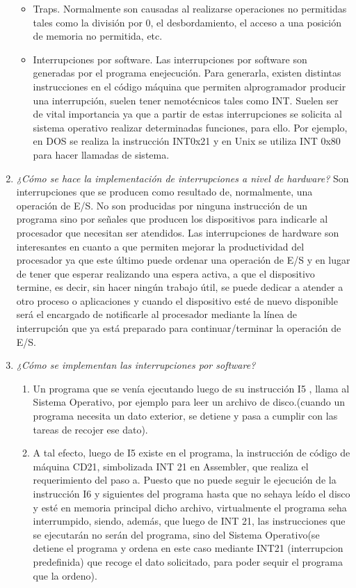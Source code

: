 \documentclass[a4paper,12pt]{article}
\begin{document}
\begin{enumerate}
\begin{itemize}
\item Traps. Normalmente son causadas al realizarse operaciones no permitidas tales como la división por 0, el desbordamiento, el acceso a una posición de memoria no permitida, etc.

\item Interrupciones por software. Las interrupciones por software son generadas por el programa enejecución. Para generarla, existen distintas instrucciones en el código máquina que permiten alprogramador producir una interrupción, suelen tener nemotécnicos tales como INT. Suelen ser de vital importancia ya que a partir de estas interrupciones se solicita al sistema operativo realizar determinadas funciones, para ello. Por ejemplo, en DOS se realiza la instrucción INT0x21 y en Unix se utiliza INT 0x80 para hacer llamadas de sistema.


\end{itemize}

\item {\it ¿Cómo se hace la implementación de interrupciones a nivel de hardware?}
Son interrupciones que se producen como resultado de, normalmente, una operación de E/S. No son producidas por ninguna instrucción de un programa sino por señales que producen los dispositivos para indicarle al procesador que necesitan ser atendidos. Las interrupciones de hardware son interesantes en cuanto a que permiten mejorar la productividad del procesador ya que este último puede ordenar una operación de E/S y en lugar de tener que esperar realizando una espera activa, a que el dispositivo termine, es decir, sin hacer ningún trabajo útil, se puede dedicar a atender a otro proceso o aplicaciones y cuando el dispositivo esté de nuevo disponible será el encargado de notificarle al procesador mediante la línea de interrupción que ya está preparado para continuar/terminar la operación de E/S.

\item {\it ¿Cómo se implementan las interrupciones por software?}


\begin{enumerate}
\item Un programa que se venía ejecutando luego de su instrucción I5 , llama al Sistema Operativo, por ejemplo para leer un archivo de disco.(cuando un programa necesita un dato exterior, se detiene y pasa a cumplir con las tareas de recojer ese dato).

\item A tal efecto, luego de I5 existe en el programa, la instrucción de código de máquina CD21, simbolizada INT 21 en Assembler, que realiza el requerimiento del paso a. Puesto que no puede seguir le ejecución de la instrucción I6 y siguientes del programa hasta que no sehaya leído el disco y esté en memoria principal dicho archivo, virtualmente el programa seha interrumpido, siendo, además, que luego de INT 21, las instrucciones que se ejecutarán no serán del programa, sino del Sistema Operativo(se detiene el programa y ordena en este caso mediante INT21 (interrupcion predefinida) que recoge el dato solicitado, para poder sequir el programa que la ordeno).


\end{enumerate}
\end{enumerate}
\end{document}
